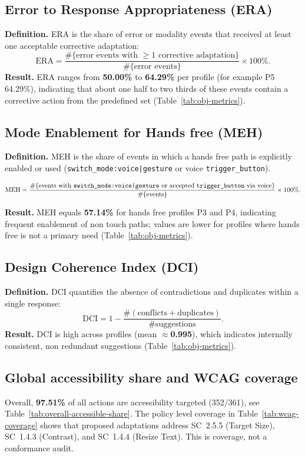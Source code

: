 \subsection{Error to Response Appropriateness (ERA)}
\textbf{Definition.}
ERA is the share of error or modality events that received at least one acceptable corrective adaptation:
\[
\mathrm{ERA} = \frac{\#\{\text{error events with }\geq 1 \text{ corrective adaptation}\}}{\#\{\text{error events}\}} \times 100\%.
\]
\textbf{Result.}
ERA ranges from \textbf{50.00\%} to \textbf{64.29\%} per profile (for example P5 64.29\%), indicating that about one half to two thirds of these events contain a corrective action from the predefined set (Table~\ref{tab:obj-metrics}).

\subsection{Mode Enablement for Hands free (MEH)}
\textbf{Definition.}
MEH is the share of events in which a hands free path is explicitly enabled or used (\texttt{switch\_mode:voice|gesture} or voice \texttt{trigger\_button}).

\[
\mathrm{MEH} = \frac{\#\{\text{events with \texttt{switch\_mode:voice|gesture} or accepted \texttt{trigger\_button} via voice}\}}{\#\{\text{events}\}} \times 100\%.
\]

\textbf{Result.}
MEH equals \textbf{57.14\%} for hands free profiles P3 and P4, indicating frequent enablement of non touch paths; values are lower for profiles where hands free is not a primary need (Table~\ref{tab:obj-metrics}).

\subsection{Design Coherence Index (DCI)}
\textbf{Definition.}
DCI quantifies the absence of contradictions and duplicates within a single response:
\[
\mathrm{DCI} = 1 - \frac{\#(\text{conflicts}+\text{duplicates})}{\#\text{suggestions}}.
\]
\textbf{Result.}
DCI is high across profiles (mean $\approx$\textbf{0.995}), which indicates internally consistent, non redundant suggestions (Table~\ref{tab:obj-metrics}).

\subsection{Global accessibility share and WCAG coverage}
Overall, \textbf{97.51\%} of all actions are accessibility targeted (352/361), see Table~\ref{tab:overall-accessible-share}. The policy level coverage in Table~\ref{tab:wcag-coverage} shows that proposed adaptations address SC~2.5.5 (Target Size), SC~1.4.3 (Contrast), and SC~1.4.4 (Resize Text). This is coverage, not a conformance audit.

